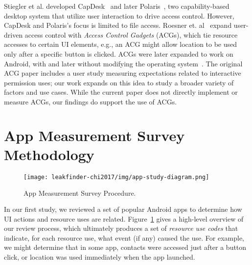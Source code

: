 Stiegler et al. developed CapDesk~\cite{capdesk} and later Polaris~\cite{Stiegler:2006}, 
two capability-based desktop system that utilize user interaction to drive access control.
However, CapDesk and Polaris's focus is limited to file access.
Roesner et. al~\cite{Roesner:2012} expand user-driven access control with \emph{Access Control
  Gadgets} (ACGs), which tie resource accesses to certain UI elements,
e.g., an ACG might allow location to be used only after a specific
button is clicked. ACGs were later expanded to work on Android, with 
and later without modifying the operating system~\cite{Roesner:2013,Ringer:2016}.
The original ACG paper includes a user study measuring 
expectations related to interactive permission uses; our work 
expands on this idea to study a broader variety of factors and 
use cases. 
While the current paper
does not directly implement or measure ACGs, our findings do support
the use of ACGs.

\section{App Measurement Survey Methodology}

\begin{figure}[tb]
  \centering
  \texttt{[image: leakfinder-chi2017/img/app-study-diagram.png]}
  \caption{App Measurement Survey Procedure.}
  \label{fig:measurement-summary}
\end{figure}


In our first study, we reviewed a set of popular Android apps to determine
how UI actions and resource uses are related.
Figure~\ref{fig:measurement-summary} gives a high-level
overview of our review process, which ultimately produces
a set of \emph{resource use codes} that indicate, for each resource use,
what event (if any) caused the use. For example, we might
determine that in some app, contacts were accessed just after a button
click, or location was used immediately when the app launched.

